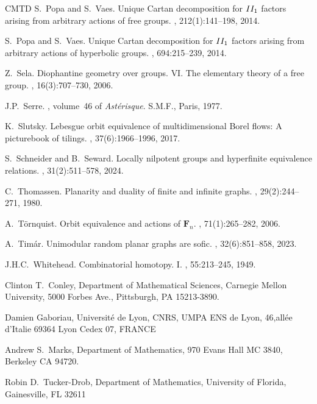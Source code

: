 \documentclass[11pt]{amsart}
\theoremstyle{definition}
\theoremstyle{plain}
\newcommand{\<}{\langle}
\renewcommand{\>}{\rangle}
\newcommand{\FF}{\mathbf{F}}
\begin{document}
\begin{thebibliography}{CMTD}
S.~Popa and S.~Vaes.
\newblock Unique {C}artan decomposition for {$\rm II_1$} factors arising from
  arbitrary actions of free groups.
, 212(1):141--198, 2014.

S.~Popa and S.~Vaes.
\newblock Unique {C}artan decomposition for {$\rm II_{1}$} factors arising from
  arbitrary actions of hyperbolic groups.
, 694:215--239, 2014.

Z.~Sela.
\newblock Diophantine geometry over groups. {VI}. {T}he elementary theory of a
  free group.
, 16(3):707--730, 2006.

J.P.~Serre.
, volume~46 of {\em
  Ast\'erisque}.
\newblock S.M.F., Paris, 1977.

K.~Slutsky.
\newblock Lebesgue orbit equivalence of multidimensional {B}orel flows: A
  picturebook of tilings.
, 37(6):1966--1996, 2017.

S.~Schneider and B.~Seward.
\newblock Locally nilpotent groups and hyperfinite equivalence relations.
, 31(2):511--578, 2024.

C.~Thomassen.
\newblock Planarity and duality of finite and infinite graphs.
, 29(2):244--271,
  1980.

A.~T{\"o}rnquist.
\newblock Orbit equivalence and actions of {$\FF_n$}.
, 71(1):265--282, 2006.

A.~Tim{\'a}r.
\newblock Unimodular random planar graphs are sofic.
, 32(6):851--858, 2023.

J.H.C.~Whitehead.
\newblock Combinatorial homotopy. {I}.
, 55:213--245, 1949.

\end{thebibliography}


\noindent Clinton T.~Conley, Department of Mathematical Sciences, Carnegie Mellon University, 5000 Forbes Ave., Pittsburgh, PA 15213-3890.  
\medskip

\noindent Damien Gaboriau, Université de Lyon, CNRS, UMPA ENS de Lyon, 46,allée d’Italie 69364 Lyon Cedex 07, FRANCE 
\medskip

\noindent Andrew S.~Marks, Department of Mathematics, 970 Evans Hall MC 3840,
Berkeley CA 94720. 
\medskip

\noindent Robin D.~Tucker-Drob, Department of Mathematics, University of Florida, Gainesville, FL 32611 
\end{document}
